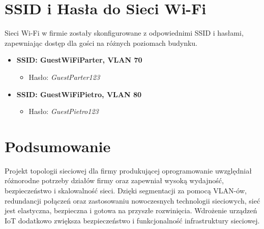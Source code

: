 \section{SSID i Hasła do Sieci Wi-Fi}
Sieci Wi-Fi w firmie zostały skonfigurowane z odpowiednimi SSID i hasłami, zapewniając dostęp dla gości na różnych poziomach budynku.
\begin{itemize}
    \item \textbf{SSID: GuestWiFiParter, VLAN 70}
    \begin{itemize}
        \item Hasło: \textit{GuestParter123}
    \end{itemize}
    \item \textbf{SSID: GuestWiFiPietro, VLAN 80}
    \begin{itemize}
        \item Hasło: \textit{GuestPietro123}
    \end{itemize}
\end{itemize}

\section{Podsumowanie}
Projekt topologii sieciowej dla firmy produkującej oprogramowanie uwzględniał różnorodne potrzeby działów firmy oraz zapewniał wysoką wydajność, bezpieczeństwo i skalowalność sieci. Dzięki segmentacji za pomocą VLAN-ów, redundancji połączeń oraz zastosowaniu nowoczesnych technologii sieciowych, sieć jest elastyczna, bezpieczna i gotowa na przyszłe rozwinięcia. Wdrożenie urządzeń IoT dodatkowo zwiększa bezpieczeństwo i funkcjonalność infrastruktury sieciowej.
